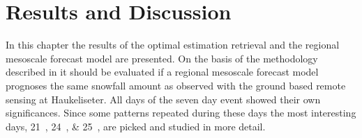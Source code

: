 \chapter{Results and Discussion} \label{ch:Res}
%
In this chapter the results of the optimal estimation retrieval and the regional mesoscale forecast model are presented. On the basis of the methodology described in  it should be evaluated if a regional mesoscale forecast model prognoses the same snowfall amount as observed with the ground based remote sensing at Haukeliseter. All days of the seven day event showed their own significances. Since some patterns repeated during these days the most interesting days, \SIlist{21;24;25}{\dec}, are picked and studied in more detail.
%
